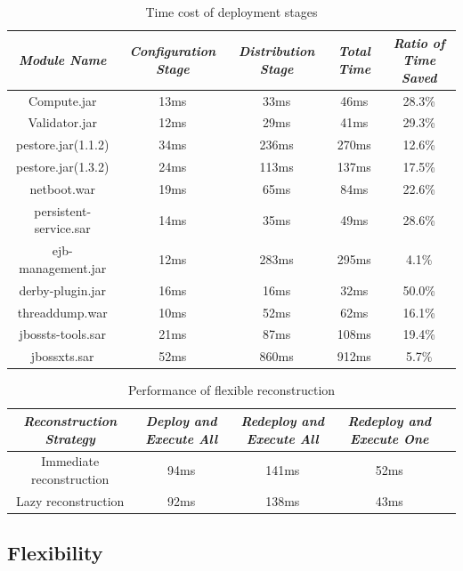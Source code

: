 \documentclass[conference]{IEEEtran}
\begin{document}
\begin{table}
\centering
\caption{Time cost of deployment stages}
\label{tab:stage}
\begin{tabular}{|c|c|c|c|c|}
\hline
\emph{Module Name}	&	\emph{Configuration Stage}	&	\emph{Distribution Stage}	&	\emph{Total Time}	&	\emph{Ratio of Time Saved}\\
\hline
\hline
Compute.jar		&	13ms			&	33ms			&	46ms			&	28.3\%\\
\hline
Validator.jar		&	12ms			&	29ms			&	41ms			&	29.3\%\\
\hline
pestore.jar(1.1.2)	&	34ms			&	236ms			&	270ms			&	12.6\%\\
\hline
pestore.jar(1.3.2)	&	24ms			&	113ms			&	137ms			&	17.5\%\\
\hline
netboot.war		&	19ms		 	&	65ms			&	84ms			&	22.6\%\\
\hline
persistent-service.sar 	& 	14ms 			&	35ms			&	49ms			&	28.6\%\\
\hline
ejb-management.jar	& 	12ms		 	&	283ms			&	295ms			&	4.1\%\\
\hline
derby-plugin.jar	&	16ms			&	16ms			&	32ms			&	50.0\%\\
\hline
threaddump.war		&	10ms			&	52ms			&	62ms			&	16.1\%\\
\hline
jbossts-tools.sar	&	21ms			&	87ms			&	108ms			&	19.4\%\\
\hline
jbossxts.sar		&	52ms			&	860ms			&	912ms			&	5.7\%\\
\hline
\end{tabular}
\end{table}


\begin{table}
\centering
\caption{Performance of flexible reconstruction}
\label{tab:flexibility}
\begin{tabular}{|c|c|c|c|c|}
\hline
\emph{Reconstruction Strategy}	& \emph{Deploy and Execute All}	& \emph{Redeploy and Execute All} & \emph{Redeploy and Execute One}\\
\hline
\hline
Immediate reconstruction 	&	94ms				&	141ms				&	52ms\\
\hline
Lazy reconstruction 	&	92ms				&	138ms				&	43ms\\
\hline
\end{tabular}
\end{table}


\subsection{Flexibility}
\end{document}

